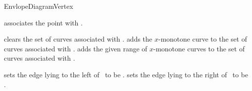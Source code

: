 \begin{ccRefConcept}{EnvlopeDiagramVertex}
\ccModifiers

    {associates the point  with \ccVar.}

    {clears the set of curves associated with \ccVar.}
\ccGlue
{}
    {adds the $x$-monotone curve  to the set of curves associated with \ccVar.}
\ccGlue
{}
    {adds the given range of $x$-monotone curves to the set of curves associated with \ccVar.}

    {sets the edge lying to the left of \ccVar\ to be .}
\ccGlue
{}
    {sets the edge lying to the right of \ccVar\ to be .}

\ccSeeAlso
     \\
     \\

\end{ccRefConcept}

\ccRefPageEnd

